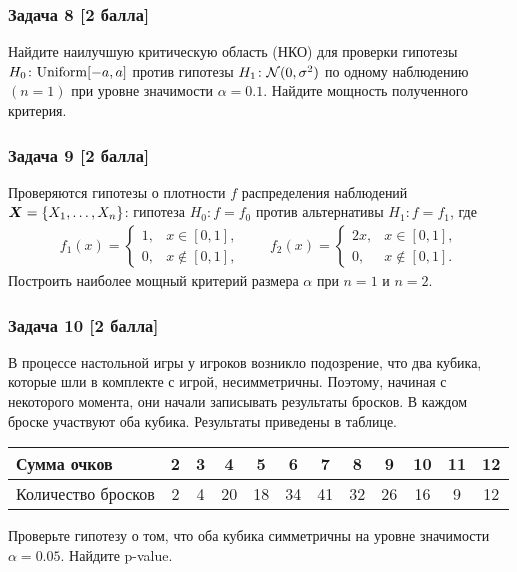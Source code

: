 \documentclass{article}
\begin{document}
\subsubsection*{Задача 8 [2 балла]}
Найдите наилучшую критическую область (НКО) для проверки гипотезы $H_0 \colon \mathrm{Uniform}[-a, a]$ против гипотезы $H_1 \colon \mathcal{N}(0, \sigma^2)$ по одному
наблюдению $(n = 1)$ при уровне значимости $\alpha = 0.1$. Найдите мощность полученного критерия.

\subsubsection*{Задача 9 [2 балла]}
Проверяются гипотезы о плотности $f$ распределения наблюдений $\boldsymbol{X} = \{X_1,\dots,X_n\}$: гипотеза $H_0\colon f = f_0$ против альтернативы $H_1\colon f = f_1$, где
\begin{gather*}
	f_1(x) = 
	\begin{cases}
		1, &x \in [0,1],\\
		0, &x \notin [0, 1],
	\end{cases}
	\qquad
	f_2(x)=
	\begin{cases}
		2x, &x \in [0, 1], \\
		0, &x \notin [0, 1].
	\end{cases}
\end{gather*}
Построить наиболее мощный критерий размера $\alpha$ при $n = 1$ и $n = 2$.

\subsubsection*{Задача 10 [2 балла]}
В процессе настольной игры у игроков возникло подозрение, что два кубика, которые шли в комплекте с игрой, несимметричны. Поэтому, начиная с некоторого момента, они начали записывать результаты бросков. В каждом броске участвуют оба кубика. Результаты приведены в таблице.
\begin{table}[h]
	\centering
	\begin{tabular}{|l|c|c|c|c|c|c|c|c|c|c|c|}
		\hline
		Сумма очков & 2 & 3 & 4 & 5 & 6 & 7 & 8 & 9 & 10 & 11 & 12\\ \hline
		Количество бросков & 2 & 4 & 20 & 18 & 34 & 41 & 32 & 26 & 16 & 9 & 12 \\
		\hline
	\end{tabular}
\end{table}

Проверьте гипотезу о том, что оба кубика симметричны на уровне значимости $\alpha = 0.05$. Найдите p-value.
\end{document}
